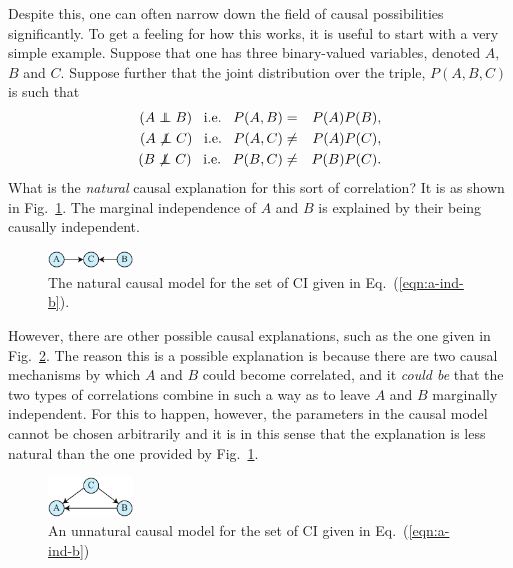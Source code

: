 \documentclass[letterpaper,onecolumn,nofootinbib]{revtex4}
\def\indep{\perp\!\!\!\!\perp}
\begin{document}
Despite this, one can often narrow down the field of causal possibilities
significantly.  To get a feeling for how this works, it is useful to start
with a very simple example.  Suppose that one has three binary-valued
variables, denoted $A,$ $B$ and $C.$ Suppose further that the joint
distribution over the triple, $P(A,B,C)$ is such that%
\begin{eqnarray}
(A \indep B) \;\;\;\textrm{i.e.}\;\;\; P(A,B) &=&P(A)P(B),  \notag \\
(A \not\indep C) \;\;\;\textrm{i.e.}\;\;\; P(A,C) &\neq &P(A)P(C),  \notag \\
(B \not\indep C) \;\;\;\textrm{i.e.}\;\;\; P(B,C) &\neq &P(B)P(C).
\label{eqn:a-ind-b}
\end{eqnarray}%
What is the \emph{natural} causal explanation for this sort of correlation?
It is as shown in Fig.~\ref{fig:a-ind-b}. The marginal independence of $A$ and $B$ is explained by their being causally independent.

\begin{figure}[h]
	\centering
	\includegraphics[width=0.2\textwidth]{a-ind-b}
 \caption{The natural causal model for the set of CI given in Eq.~(\ref{eqn:a-ind-b}).}
       \label{fig:a-ind-b}
\end{figure}

However, there are other possible causal explanations, such as the one given in Fig.~\ref{fig:a-ind-b-alt}. The reason this is a possible explanation is because there are two causal
mechanisms by which $A$ and $B$ could become correlated, and it \emph{
could be }that the two types of correlations combine in such a way as to
leave $A$ and $B$ marginally independent.
For this to happen, however, the parameters in the causal model cannot be chosen arbitrarily and it is in this sense that the explanation is less natural than the one provided by Fig.~\ref{fig:a-ind-b}.

\begin{figure}[h]
	\centering
	\includegraphics[width=0.2\textwidth]{a-ind-b-alt}
 \caption{An unnatural causal model for the set of CI given in Eq.~(\ref{eqn:a-ind-b})}
       \label{fig:a-ind-b-alt}
\end{figure}
\end{document}
